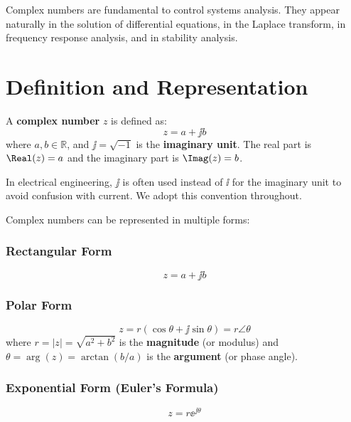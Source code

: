 Complex numbers are fundamental to control systems analysis. They appear naturally in the solution of differential equations, in the Laplace transform, in frequency response analysis, and in stability analysis.

\section{Definition and Representation}

\begin{definitionbox}[title=Definition 0.1: Complex Number]
A \textbf{complex number} $z$ is defined as:
\begin{equation}
z = a + \jj b
\end{equation}
where $a, b \in \mathbb{R}$, and $\jj = \sqrt{-1}$ is the \textbf{imaginary unit}. The real part is $\Real(z) = a$ and the imaginary part is $\Imag(z) = b$.
\end{definitionbox}

\begin{note}
In electrical engineering, $\jj$ is often used instead of $\ii$ for the imaginary unit to avoid confusion with current. We adopt this convention throughout.
\end{note}

Complex numbers can be represented in multiple forms:

\subsubsection{Rectangular Form}
\begin{equation}
z = a + \jj b
\end{equation}

\subsubsection{Polar Form}
\begin{equation}
z = r(\cos\theta + \jj\sin\theta) = r \angle \theta
\end{equation}
where $r = |z| = \sqrt{a^2 + b^2}$ is the \textbf{magnitude} (or modulus) and $\theta = \arg(z) = \arctan(b/a)$ is the \textbf{argument} (or phase angle).

\subsubsection{Exponential Form (Euler's Formula)}
\begin{equation}
z = r \ee^{\jj\theta}
\end{equation}

